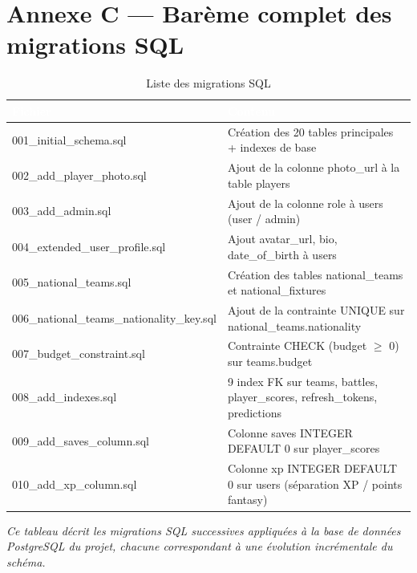 \section*{Annexe C --- Barème complet des migrations SQL}

\vspace{0.3cm}

\begin{table}[!htbp]
\centering
    \begin{tabularx}{\linewidth}{|l|X|}
        \hline
        \rowcolor{emsigreen}\textcolor{white}{\textbf{Fichier}} & \textcolor{white}{\textbf{Contenu}} \\
        \hline
        001\_initial\_schema.sql & Création des 20 tables principales + indexes de base \\
        \hline
        002\_add\_player\_photo.sql & Ajout de la colonne photo\_url à la table players \\
        \hline
        003\_add\_admin.sql & Ajout de la colonne role à users (user / admin) \\
        \hline
        004\_extended\_user\_profile.sql & Ajout avatar\_url, bio, date\_of\_birth à users \\
        \hline
        005\_national\_teams.sql & Création des tables national\_teams et national\_fixtures \\
        \hline
        006\_national\_teams\_nationality\_key.sql & Ajout de la contrainte UNIQUE sur national\_teams.nationality \\
        \hline
        007\_budget\_constraint.sql & Contrainte CHECK (budget $\geq$ 0) sur teams.budget \\
        \hline
        008\_add\_indexes.sql & 9 index FK sur teams, battles, player\_scores, refresh\_tokens, predictions \\
        \hline
        009\_add\_saves\_column.sql & Colonne saves INTEGER DEFAULT 0 sur player\_scores \\
        \hline
        010\_add\_xp\_column.sql & Colonne xp INTEGER DEFAULT 0 sur users (séparation XP / points fantasy) \\
        \hline
    \end{tabularx}
\caption{Liste des migrations SQL}
\end{table}

\vspace{0.2cm}
\noindent\small\textit{Ce tableau décrit les migrations SQL successives appliquées à la base de données PostgreSQL du projet, chacune correspondant à une évolution incrémentale du schéma.}\normalsize

\restoregeometry
